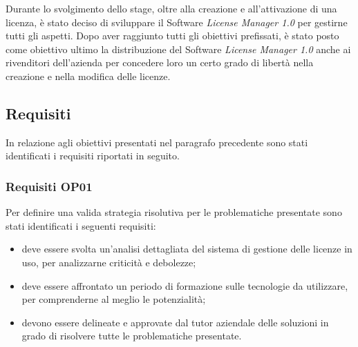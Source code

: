 Durante lo svolgimento dello stage, oltre alla creazione e all'attivazione di una licenza, è stato deciso di sviluppare il Software \textit{License Manager 1.0} per gestirne tutti gli aspetti. Dopo aver raggiunto tutti gli obiettivi prefissati, è stato posto come obiettivo ultimo la distribuzione del Software \textit{License Manager 1.0} anche ai rivenditori dell'azienda per concedere loro un certo grado di libertà nella creazione e nella modifica delle licenze. 

\subsection{Requisiti}

In relazione agli obiettivi presentati nel paragrafo precedente sono stati identificati i requisiti riportati in seguito.

\subsubsection{Requisiti OP01}
Per definire una valida strategia risolutiva per le problematiche presentate sono stati identificati i seguenti requisiti:

\begin{itemize}
\item deve essere svolta un'analisi dettagliata del sistema di gestione delle licenze in uso, per analizzarne criticità e debolezze;
\item deve essere affrontato un periodo di formazione sulle tecnologie da utilizzare, per comprenderne al meglio le potenzialità;
\item devono essere delineate e approvate dal tutor aziendale delle soluzioni in grado di risolvere tutte le problematiche presentate.

\end{itemize}

